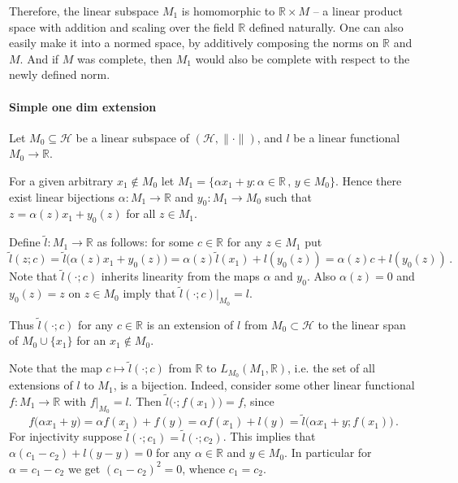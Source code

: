 \documentclass[a4paper]{article}
\newcommand{\Hcal}{\mathcal{H}}
\newcommand{\real}{\mathbb{R}}
\begin{document}
Therefore, the linear subspace $M_1$ is homomorphic to $\real \times M$ -- a linear
product space with addition and scaling over the field $\real$ defined naturally.
One can also easily make it into a normed space, by additively composing the norms
on $\real$ and $M$. And if $M$ was complete, then $M_1$ would also be complete with
respect to the newly defined norm.


\paragraph{Simple one dim extension} %
\label{par:simple_one_dim_extension}

Let $M_0\subseteq \Hcal$ be a linear subspace of $(\Hcal, \|\cdot\|)$, and $l$ be
a linear functional $M_0\to \real$.

For a given arbitrary $x_1\notin M_0$ let $M_1 = \{\alpha x_1 + y \colon \alpha \in
\real\,,\, y \in M_0\}$. Hence there exist linear bijections $\alpha\colon M_1\to
\real$ and $y_0\colon M_1\to M_0$ such that $z = \alpha(z) x_1 + y_0(z)$ for all
$z\in M_1$.

Define $\tilde{l}\colon M_1 \to \real$ as follows: for some $c \in \real$ for any 
$z \in M_1$ put
\begin{equation*}
  \tilde{l}(z; c)
    = \tilde{l}\bigl(\alpha(z) x_1 + y_0(z) \bigr)
    = \alpha(z) \tilde{l}(x_1) + l(y_0(z))
    = \alpha(z) c + l(y_0(z))
    \,.
\end{equation*}
Note that $\tilde{l}(\cdot; c)$ inherits linearity from the maps $\alpha$ and $y_0$.
Also $\alpha(z) = 0$ and $y_0(z) = z$ on $z\in M_0$ imply that $\tilde{l}(\cdot; c)%
\big\vert_{M_0} = l$.

Thus $\tilde{l}(\cdot; c)$ for any $c\in \real$ is an extension of $l$ from $M_0
\subset \Hcal$ to the linear span of $M_0 \cup \{x_1\}$ for an $x_1\notin M_0$.

Note that the map $c\mapsto \tilde{l}(\cdot; c)$ from $\real$ to $L_{M_0}(M_1, \real)$,
i.e. the set of all extensions of $l$ to $M_1$, is a bijection. Indeed, consider some
other linear functional $f\colon M_1 \to \real$ with $f\big\vert_{M_0} = l$. Then
$\tilde{l}\bigl(\cdot; f(x_1)\bigr) = f$, since
\begin{equation*}
  f\bigl(\alpha x_1 + y \bigr)
    = \alpha f(x_1) + f(y)
    = \alpha f(x_1) + l(y)
    = \tilde{l}\bigl(\alpha x_1 + y; f(x_1)\bigr)
    \,.
\end{equation*}
For injectivity suppose $\tilde{l}(\cdot; c_1) = \tilde{l}(\cdot; c_2)$. This implies
that $\alpha (c_1 - c_2) + l(y - y) = 0$ for any $\alpha \in \real$ and $y\in M_0$.
In particular for $\alpha = c_1 - c_2$ we get $(c_1 - c_2)^2 = 0$, whence $c_1 = c_2$.
\end{document}
